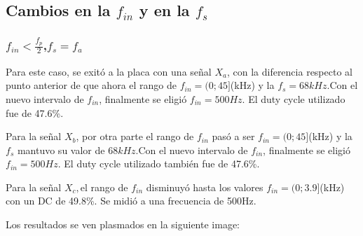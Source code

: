 \documentclass[../../ASSD_TP1_G7.tex]{subfiles}
\begin{document}
\subsection{Cambios en la $f_{in}$ y en la $f_{s}$}

\subsubsection{$f_{in}<\frac{f_{p}}{2}$,$f_{s}=f_{a}$}

Para este caso, se exitó a la placa con una señal $X_{a}$, con la
diferencia respecto al punto anterior de que ahora el rango de $f_{in}=(0;45]$(kHz)
y la $f_{s}=68kHz.$Con el nuevo intervalo de $f_{in}$, finalmente
se eligió $f_{in}=500Hz.$ El duty cycle utilizado fue de 47.6\%.

Para la señal $X_{b}$, por otra parte el rango de $f_{in}$ pasó
a ser $f_{in}=(0;45]$(kHz) y la $f_{s}$ mantuvo su valor de $68kHz.$Con
el nuevo intervalo de $f_{in}$, finalmente se eligió $f_{in}=500Hz.$
El duty cycle utilizado también fue de 47.6\%.

Para la señal $X_{c},$el rango de $f_{in}$ disminuyó hasta los valores
$f_{in}=(0;3.9]$(kHz) con un DC de 49.8\%. Se midió a una frecuencia
de 500Hz.

Los resultados se ven plasmados en la siguiente image:
\end{document}
